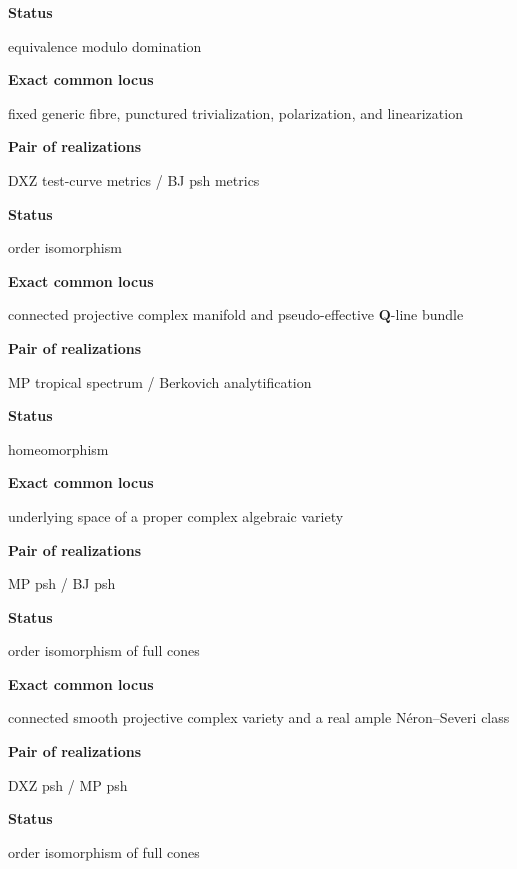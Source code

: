 \textbf{Status}\par\nopagebreak
equivalence modulo domination\par\nopagebreak

\textbf{Exact common locus}\par\nopagebreak
fixed generic fibre, punctured trivialization, polarization, and
linearization

\medskip
\textbf{Pair of realizations}\par\nopagebreak
DXZ test-curve metrics / BJ psh metrics\par\nopagebreak

\textbf{Status}\par\nopagebreak
order isomorphism\par\nopagebreak

\textbf{Exact common locus}\par\nopagebreak
connected projective complex manifold and pseudo-effective
$\mathbf Q$-line bundle

\medskip
\textbf{Pair of realizations}\par\nopagebreak
MP tropical spectrum / Berkovich analytification\par\nopagebreak

\textbf{Status}\par\nopagebreak
homeomorphism\par\nopagebreak

\textbf{Exact common locus}\par\nopagebreak
underlying space of a proper complex algebraic variety

\medskip
\textbf{Pair of realizations}\par\nopagebreak
MP psh / BJ psh\par\nopagebreak

\textbf{Status}\par\nopagebreak
order isomorphism of full cones\par\nopagebreak

\textbf{Exact common locus}\par\nopagebreak
connected smooth projective complex variety and a real ample
N\'eron--Severi class

\medskip
\textbf{Pair of realizations}\par\nopagebreak
DXZ psh / MP psh\par\nopagebreak

\textbf{Status}\par\nopagebreak
order isomorphism of full cones\par\nopagebreak

